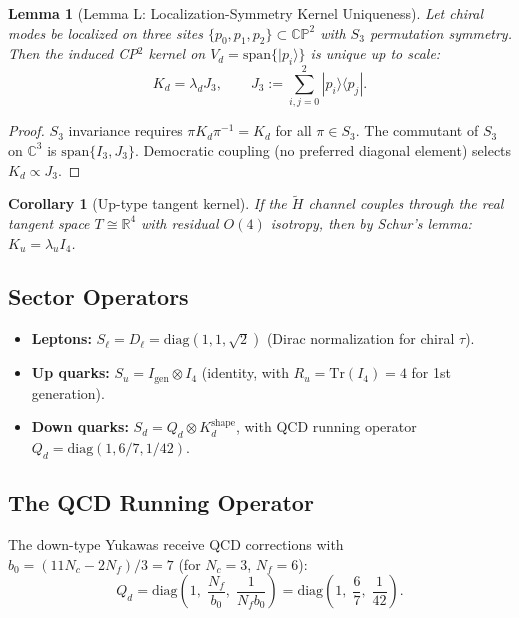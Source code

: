 \documentclass[11pt,a4paper]{article}
\newcommand{\CP}{\mathbb{CP}}
\newcommand{\R}{\mathbb{R}}
\newcommand{\Tr}{\mathrm{Tr}}
\newtheorem{lemma}[theorem]{Lemma}
\newtheorem{corollary}[theorem]{Corollary}
\theoremstyle{remark}
\begin{document}
\begin{lemma}[Lemma L: Localization-Symmetry Kernel Uniqueness]
\label{lem:L}
Let chiral modes be localized on three sites $\{p_0, p_1, p_2\} \subset \CP^2$
with $S_3$ permutation symmetry.  Then the induced CP$^2$ kernel on
$V_d = \mathrm{span}\{|p_i\rangle\}$ is unique up to scale:
\[
K_d = \lambda_d J_3, \qquad J_3 := \sum_{i,j=0}^{2} |p_i\rangle\langle p_j|.
\]
\end{lemma}

\begin{proof}
$S_3$ invariance requires $\pi K_d \pi^{-1} = K_d$ for all $\pi \in S_3$.
The commutant of $S_3$ on $\mathbb{C}^3$ is $\mathrm{span}\{I_3, J_3\}$.
Democratic coupling (no preferred diagonal element) selects $K_d \propto J_3$.
\end{proof}

\begin{corollary}[Up-type tangent kernel]
If the $\widetilde{H}$ channel couples through the real tangent space
$T \cong \R^4$ with residual $O(4)$ isotropy, then by Schur's lemma:
$K_u = \lambda_u I_4$.
\end{corollary}

\subsection{Sector Operators}

\begin{itemize}
\item \textbf{Leptons:}
  $S_\ell = D_\ell = \mathrm{diag}(1, 1, \sqrt{2})$
  (Dirac normalization for chiral $\tau$).
\item \textbf{Up quarks:}
  $S_u = I_{\text{gen}} \otimes I_4$
  (identity, with $R_u = \Tr(I_4) = 4$ for 1st generation).
\item \textbf{Down quarks:}
  $S_d = Q_d \otimes K_d^{\text{shape}}$, with QCD running operator
  $Q_d = \mathrm{diag}(1, 6/7, 1/42)$.
\end{itemize}

\subsection{The QCD Running Operator}

The down-type Yukawas receive QCD corrections with
$b_0 = (11 N_c - 2 N_f)/3 = 7$ (for $N_c = 3$, $N_f = 6$):
\begin{equation}
Q_d = \mathrm{diag}\!\left(1,\;\frac{N_f}{b_0},\;\frac{1}{N_f b_0}\right)
= \mathrm{diag}\!\left(1,\;\frac{6}{7},\;\frac{1}{42}\right).
\end{equation}
\end{document}
